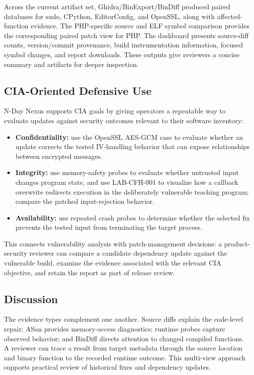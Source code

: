 \documentclass[conference]{IEEEtran}
\newcommand{\tool}{N-Day Nexus}
\begin{document}
Across the current artifact set, Ghidra/BinExport/BinDiff produced paired databases for sudo, CPython, EditorConfig, and OpenSSL, along with affected-function evidence. The PHP-specific source and ELF symbol comparison provides the corresponding paired patch view for PHP. The dashboard presents source-diff counts, version/commit provenance, build instrumentation information, focused symbol changes, and report downloads. These outputs give reviewers a concise summary and artifacts for deeper inspection.

\subsection{CIA-Oriented Defensive Use}
\tool{} supports CIA goals by giving operators a repeatable way to evaluate updates against security outcomes relevant to their software inventory:
\begin{itemize}
  \item \textbf{Confidentiality:} use the OpenSSL AES-GCM case to evaluate whether an update corrects the tested IV-handling behavior that can expose relationships between encrypted messages.
  \item \textbf{Integrity:} use memory-safety probes to evaluate whether untrusted input changes program state, and use LAB-CFH-001 to visualize how a callback overwrite redirects execution in the deliberately vulnerable teaching program; compare the patched input-rejection behavior.
  \item \textbf{Availability:} use repeated crash probes to determine whether the selected fix prevents the tested input from terminating the target process.
\end{itemize}
This connects vulnerability analysis with patch-management decisions: a product-security reviewer can compare a candidate dependency update against the vulnerable build, examine the evidence associated with the relevant CIA objective, and retain the report as part of release review.

\subsection{Discussion}
The evidence types complement one another. Source diffs explain the code-level repair; ASan provides memory-access diagnostics; runtime probes capture observed behavior; and BinDiff directs attention to changed compiled functions. A reviewer can trace a result from target metadata through the source location and binary function to the recorded runtime outcome. This multi-view approach supports practical review of historical fixes and dependency updates.
\end{document}
